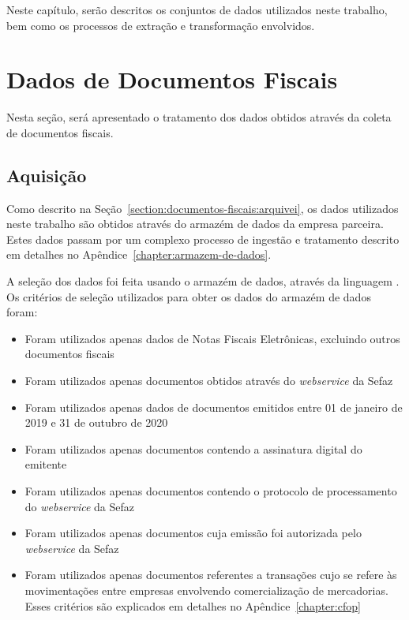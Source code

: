
Neste capítulo, serão descritos os conjuntos de dados utilizados neste trabalho, bem como os processos de extração e transformação envolvidos.

\section{Dados de Documentos Fiscais}
\label{section:base-de-dados:dados-de-documentos-fiscais}

Nesta seção, será apresentado o tratamento dos dados obtidos através da coleta de documentos fiscais.

\subsection{Aquisição}
\label{section:base-de-dados:dados-de-documentos-fiscais:aquisicao}

Como descrito na Seção~\ref{section:documentos-fiscais:arquivei}, os dados utilizados neste trabalho são obtidos através do armazém de dados da empresa parceira. Estes dados passam por um complexo processo de ingestão e tratamento descrito em detalhes no Apêndice~\ref{chapter:armazem-de-dados}.

A seleção dos dados foi feita usando o armazém de dados, através da linguagem . Os critérios de seleção utilizados para obter os dados do armazém de dados foram:

\begin{itemize}
    \item Foram utilizados apenas dados de Notas Fiscais Eletrônicas, excluindo outros documentos fiscais
    \item Foram utilizados apenas documentos obtidos através do \textit{webservice} da Sefaz
    \item Foram utilizados apenas dados de documentos emitidos entre 01 de janeiro de 2019 e 31 de outubro de 2020
    \item Foram utilizados apenas documentos contendo a assinatura digital do emitente
    \item Foram utilizados apenas documentos contendo o protocolo de processamento do \textit{webservice} da Sefaz
    \item Foram utilizados apenas documentos cuja emissão foi autorizada pelo \textit{webservice} da Sefaz
    \item Foram utilizados apenas documentos referentes a transações cujo  se refere às movimentações entre empresas envolvendo comercialização de mercadorias. Esses critérios são explicados em detalhes no Apêndice~\ref{chapter:cfop}
\end{itemize}

